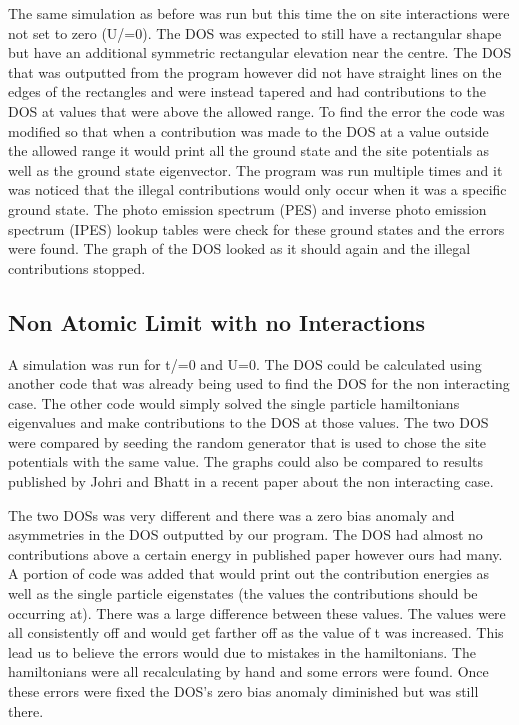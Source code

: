 \documentclass{article}
\begin{document}
The same simulation as before was run but this time the on site interactions were not set to zero (U/=0). The DOS was expected to still have a rectangular shape but have an additional symmetric rectangular elevation near the centre. The DOS that was outputted from the program however did not have straight lines on the edges of the rectangles and were instead tapered and had contributions to the DOS at values that were above the allowed range. To find the error the code was modified so that when a contribution was made to the DOS at a value outside the allowed range it would print all the ground state and the site potentials as well as the ground state eigenvector. The program was run multiple times and it was noticed that the illegal contributions would only occur when it was a specific ground state. The photo emission spectrum (PES) and inverse photo emission spectrum (IPES) lookup tables were check for these ground states and the errors were found. The graph of the DOS looked as it should again and the illegal contributions stopped. 

\subsection*{Non Atomic Limit with no Interactions}

A simulation was run for t/=0 and U=0. The DOS could be calculated using another code that was already being used to find the DOS for the non interacting case. The other code would simply solved the single particle hamiltonians eigenvalues and make contributions to the DOS at those values. The two DOS were compared by seeding the random generator that is used to chose the site potentials with the same value. The graphs could also be compared to results published by Johri and Bhatt in a recent paper about the non interacting case.

The two DOSs was very different and there was a zero bias anomaly and asymmetries in the DOS outputted by our program. The DOS had almost no contributions above a certain energy in published paper however ours had many. A portion of code was added that would print out the contribution energies as well as the single particle eigenstates (the values the contributions should be occurring at). There was a large difference between these values. The values were all consistently off and would get farther off as the value of t was increased. This lead us to believe the errors would due to mistakes in the hamiltonians. The hamiltonians were all recalculating by hand and some errors were found. Once these errors were fixed the DOS's zero bias anomaly diminished but was still there.
\end{document}
